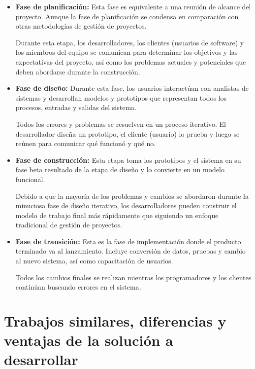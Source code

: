 \begin{itemize}
    \item \textbf{Fase de planificación:} Esta fase es equivalente a una reunión de alcance del proyecto. Aunque la fase de planificación se condensa en comparación con otras metodologías de gestión de proyectos.

          Durante esta etapa, los desarrolladores, los clientes (usuarios de software) y los miembros del equipo se comunican para determinar los objetivos y las expectativas del proyecto, así como los problemas actuales y potenciales que deben abordarse durante la construcción.

    \item \textbf{Fase de diseño:} Durante esta fase, los usuarios interactúan con analistas de sistemas y desarrollan modelos y prototipos que representan todos los procesos, entradas y salidas del sistema.

          Todos los errores y problemas se resuelven en un proceso iterativo. El desarrollador diseña un prototipo, el cliente (usuario) lo prueba y luego se reúnen para comunicar qué funcionó y qué no.

    \item \textbf{Fase de construcción:} Esta etapa toma los prototipos y el sistema en su fase beta resultado de la etapa de diseño y lo convierte en un modelo funcional.

          Debido a que la mayoría de los problemas y cambios se abordaron durante la minuciosa fase de diseño iterativo, los desarrolladores pueden construir el modelo de trabajo final más rápidamente que siguiendo un enfoque tradicional de gestión de proyectos.

    \item \textbf{Fase de transición:} Esta es la fase de implementación donde el producto terminado va al lanzamiento. Incluye conversión de datos, pruebas y cambio al nuevo sistema, así como capacitación de usuarios.

          Todos los cambios finales se realizan mientras los programadores y los clientes continúan buscando errores en el sistema.

\end{itemize}


\section{Trabajos similares, diferencias y ventajas de la solución a desarrollar}

